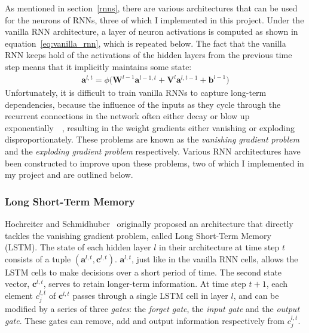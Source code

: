 \documentclass[a4paper, 12pt]{report}
\newcommand{\tit}[1]{\textit{#1}}
\begin{document}
As mentioned in section~\ref{rnns}, there are various architectures that can be used for the neurons of RNNs, three of which I implemented in this project. Under the vanilla RNN architecture, a layer of neuron activations is computed as shown in equation~\ref{eq:vanilla_rnn}, which is repeated below. The fact that the vanilla RNN keeps hold of the activations of the hidden layers from the previous time step means that it implicitly maintains some state:
\begin{gather*}
	\mathbf{a}^{l, t} = \phi \big( \mathbf{W}^{l - 1} \mathbf{a}^{l - 1, t} + \mathbf{V}^l \mathbf{a}^{l, t - 1} + \mathbf{b}^{l - 1} \big)
\end{gather*}
Unfortunately, it is difficult to train vanilla RNNs to capture long-term dependencies, because the influence of the inputs as they cycle through the recurrent connections in the network often either decay or blow up exponentially~\cite{vanishing_gradient:hochreiter1991}~\cite{vanishing_gradient:bengio1994}, resulting in the weight gradients either vanishing or exploding disproportionately. These problems are known as the \tit{vanishing gradient problem} and the \tit{exploding gradient problem} respectively. Various RNN architectures have been constructed to improve upon these problems, two of which I implemented in my project and are outlined below.

\subsubsection{Long Short-Term Memory}

Hochreiter and Schmidhuber~\cite{lstm:hochreiter1997} originally proposed an architecture that directly tackles the vanishing gradient problem, called Long Short-Term Memory (LSTM). The state of each hidden layer $l$ in their architecture at time step $t$ consists of a tuple $(\mathbf{a}^{l, t}, \mathbf{c}^{l, t})$. $\mathbf{a}^{l, t}$, just like in the vanilla RNN cells, allows the LSTM cells to make decisions over a short period of time. The second state vector, $\mathbf{c}^{l, t}$, serves to retain longer-term information. At time step $t + 1$, each element $c_j^{l, t}$ of $\mathbf{c}^{l, t}$ passes through a single LSTM cell in layer $l$, and can be modified by a series of three \tit{gates}: the \tit{forget gate}, the \tit{input gate} and the \tit{output gate}. These gates can remove, add and output information respectively from $c_j^{l, t}$. \\
\end{document}
